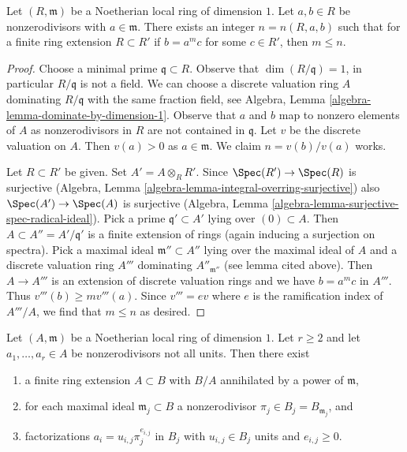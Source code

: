 \begin{lemma}
\label{lemma-not-infinitely-divisible}
Let $(R, \mathfrak m)$ be a Noetherian local ring of dimension $1$.
Let $a, b \in R$ be nonzerodivisors with $a \in \mathfrak m$.
There exists an integer $n = n(R, a, b)$ such that for a finite ring
extension $R \subset R'$ if $b = a^m c$ for some $c \in R'$, then $m \leq n$.
\end{lemma}

\begin{proof}
Choose a minimal prime $\mathfrak q \subset R$. Observe that
$\dim(R/\mathfrak q) = 1$, in particular $R/\mathfrak q$ is not a field.
We can choose a discrete valuation ring $A$ dominating $R/\mathfrak q$
with the same fraction field, see
Algebra, Lemma \ref{algebra-lemma-dominate-by-dimension-1}. Observe that
$a$ and $b$ map to nonzero elements of $A$ as nonzerodivisors in $R$
are not contained in $\mathfrak q$. Let $v$ be the discrete valuation on $A$.
Then $v(a) > 0$ as $a \in \mathfrak m$.
We claim $n = v(b)/v(a)$ works.

\medskip\noindent
Let $R \subset R'$ be given. Set $A' = A \otimes_R R'$.
Since $\Spec(R') \to \Spec(R)$ is surjective
(Algebra, Lemma \ref{algebra-lemma-integral-overring-surjective})
also $\Spec(A') \to \Spec(A)$ is surjective
(Algebra, Lemma \ref{algebra-lemma-surjective-spec-radical-ideal}).
Pick a prime $\mathfrak q' \subset A'$ lying over $(0) \subset A$.
Then $A \subset A'' = A'/\mathfrak q'$ is a finite extension of rings
(again inducing a surjection on spectra).
Pick a maximal ideal $\mathfrak m'' \subset A''$
lying over the maximal ideal of $A$ and a discrete valuation ring
$A'''$ dominating $A''_{\mathfrak m''}$ (see lemma cited above).
Then $A \to A'''$ is an extension of discrete valuation rings
and we have $b = a^m c$ in $A'''$. Thus $v'''(b) \geq mv'''(a)$.
Since $v''' = ev$ where $e$ is the ramification index
of $A'''/A$, we find that $m \leq n$ as desired.
\end{proof}

\begin{lemma}
\label{lemma-prepare-tame-symbol}
Let $(A, \mathfrak m)$ be a Noetherian local ring of dimension $1$.
Let $r \geq 2$ and let $a_1, \ldots, a_r \in A$ be nonzerodivisors
not all units.
Then there exist
\begin{enumerate}
\item a finite ring extension $A \subset B$ with
$B/A$ annihilated by a power of $\mathfrak m$,
\item for each maximal ideal $\mathfrak m_j \subset B$
a nonzerodivisor $\pi_j \in B_j = B_{\mathfrak m_j}$, and
\item factorizations $a_i = u_{i, j} \pi_j^{e_{i, j}}$ in $B_j$
with $u_{i, j} \in B_j$ units and $e_{i, j} \geq 0$.
\end{enumerate}
\end{lemma}

